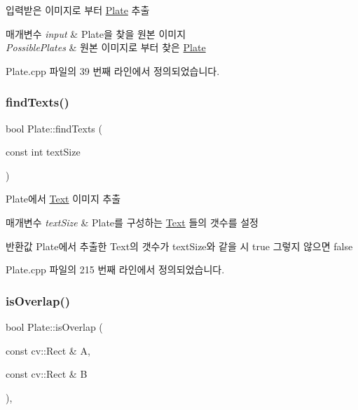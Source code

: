 입력받은 이미지로 부터 \hyperlink{class_plate}{Plate} 추출 


\begin{DoxyParams}{매개변수}
{\em input} & Plate을 찾을 원본 이미지 \\
\hline
{\em Possible\+Plates} & 원본 이미지로 부터 찾은 \hyperlink{class_plate}{Plate} \\
\hline
\end{DoxyParams}


Plate.\+cpp 파일의 39 번째 라인에서 정의되었습니다.

\mbox{\label{class_plate_aa18c9cc52a8a756d019faf82cd93ce13}} 
\subsubsection{\texorpdfstring{find\+Texts()}{findTexts()}}
{\footnotesize\ttfamily bool Plate\+::find\+Texts (\begin{DoxyParamCaption}\item[{const int}]{text\+Size }\end{DoxyParamCaption})}



Plate에서 \hyperlink{class_plate_1_1_text}{Text} 이미지 추출 


\begin{DoxyParams}{매개변수}
{\em text\+Size} & Plate를 구성하는 \hyperlink{class_plate_1_1_text}{Text} 들의 갯수를 설정 \\
\hline
\end{DoxyParams}
\begin{DoxyReturn}{반환값}
Plate에서 추출한 Text의 갯수가 text\+Size와 같을 시 true 그렇지 않으면 false 
\end{DoxyReturn}


Plate.\+cpp 파일의 215 번째 라인에서 정의되었습니다.

\mbox{\label{class_plate_afffe9775bd49995e5ae87f6880af96d4}} 
\subsubsection{\texorpdfstring{is\+Overlap()}{isOverlap()}}
{\footnotesize\ttfamily bool Plate\+::is\+Overlap (\begin{DoxyParamCaption}\item[{const cv\+::\+Rect \&}]{A,  }\item[{const cv\+::\+Rect \&}]{B }\end{DoxyParamCaption})\hspace{0.3cm}{\ttfamily [inline]}, {\ttfamily [private]}}



